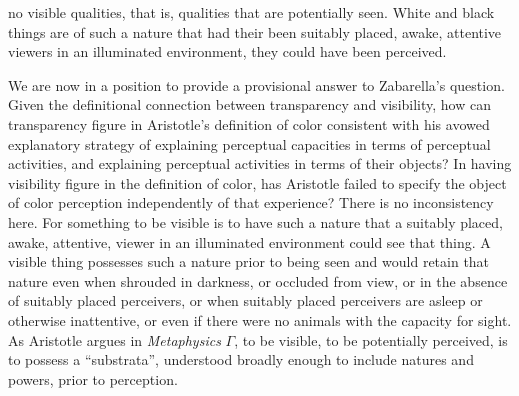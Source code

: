 no visible qualities, that is, qualities that are potentially seen. White and black things are of such a nature that had their been suitably placed, awake, attentive viewers in an illuminated environment, they could have been perceived.

We are now in a position to provide a provisional answer to Zabarella's question. Given the definitional connection between transparency and visibility, how can transparency figure in Aristotle's definition of color consistent with his avowed explanatory strategy of explaining perceptual capacities in terms of perceptual activities, and explaining perceptual activities in terms of their objects? In having visibility figure in the definition of color, has Aristotle failed to specify the object of color perception independently of that experience? There is no inconsistency here. For something to be visible is to have such a nature that a suitably placed, awake, attentive, viewer in an illuminated environment could see that thing. A visible thing possesses such a nature prior to being seen and would retain that nature even when shrouded in darkness, or occluded from view, or in the absence of suitably placed perceivers, or when suitably placed perceivers are asleep or otherwise inattentive, or even if there were no animals with the capacity for sight. As Aristotle argues in \emph{Metaphysics} \( \Gamma \), to be visible, to be potentially perceived, is to possess a ``substrata'', understood broadly enough to include natures and powers, prior to perception.

